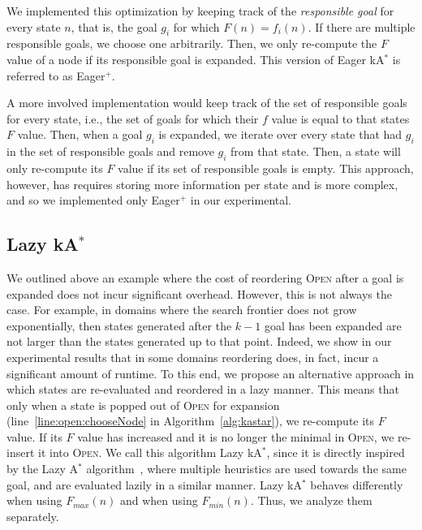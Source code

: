 \documentclass{aicom2e}
\newcommand{\astar}{A$^*$}
\newcommand{\kastar}{kA$^*$}
\newcommand{\minf}{$F_{min}(n)$}
\newcommand{\maxf}{$F_{max}(n)$}
\newcommand{\open}{\textsc{Open}}
\newcommand{\roni}[1]{\textbf{[RS:#1]}}
\begin{document}
We implemented this optimization by keeping track of the {\em responsible goal} 
for every state $n$, that is, the goal $g_i$ for which $F(n)=f_i(n)$. 
If there are multiple responsible
goals, we choose one arbitrarily. Then, we only re-compute the $F$ value of a
node if its responsible goal is expanded. This version of Eager \kastar{} is 
referred to as Eager$^+$. 


A more involved implementation would
keep track of the set of responsible goals for every state, i.e., the set of goals
for which their $f$ value is equal to that states $F$ value. 
Then, when a goal $g_i$ is expanded, 
we iterate over every state that had $g_i$ in the set of responsible goals
and remove $g_i$ from that state. Then, a state will only re-compute its $F$ value 
if its set of responsible goals is empty. 
This approach, however, has requires storing more information per state and is more 
complex, and so we implemented only  Eager$^+$ in our experimental. 





\subsection{Lazy \kastar{}}

We outlined above an example where the cost of reordering \open{} after a goal is 
expanded does not incur significant overhead. However, this is not always the case. 
For example, in domains where the search frontier does not grow exponentially, 
then states generated after the $k-1$ goal has been expanded are not larger
than the states generated up to that point. Indeed, we show in our 
experimental results that in some domains reordering does, in fact, incur a significant amount of
runtime. 
To this end, we propose
an alternative approach in which states are re-evaluated and reordered in a
lazy manner. This means that only when a state is popped out of \open{} for
expansion (line~\ref{line:open:chooseNode} in Algorithm~\ref{alg:kastar}), we
re-compute its $F$ value. If its $F$ value has increased and it is no longer
the minimal in \open, we re-insert it into \open{}. We call this algorithm Lazy
\kastar{}, since it is directly inspired by the Lazy \astar{}
algorithm~\cite{betzalel2015typeSystem,tolpin2013toward}, where multiple
heuristics are used towards the same goal, and are evaluated lazily in a
similar manner. Lazy \kastar{} behaves differently when using \maxf{} and when
using \minf{}. Thus, we analyze them separately. 
\end{document}
